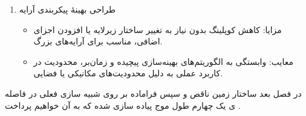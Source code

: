 \begin{enumerate}
{\begin{itemize}
{			معایب:
			 احتمال ایجاد تشعشع ناخواسته از صفحه زمین، افزایش حساسیت به دقت ساخت، تأثیر روی پهنای‌باند در برخی موارد.
		}
	\end{itemize}
	}	
	\item{
	طراحی بهینهٔ پیکربندی آرایه
	\begin{itemize}
		\item{
			مزایا:
			کاهش کوپلینگ بدون نیاز به تغییر ساختار زیرلایه یا افزودن اجزای اضافی، مناسب برای آرایه‌های بزرگ.
		}
		\item{
			معایب:
			 وابستگی به الگوریتم‌های بهینه‌سازی پیچیده و زمان‌بر، محدودیت در کاربرد عملی به دلیل محدودیت‌های مکانیکی یا فضایی.
		}
	\end{itemize}
	}		
\end{enumerate}

در فصل بعد ساختار زمین ناقص
 و سپس فراماده
  بر روی شبیه سازی فعلی در فاصله ی یک چهارم طول موج پیاده سازی شده که به آن خواهیم پرداخت
\cite{ghadimi2020systematic}.













